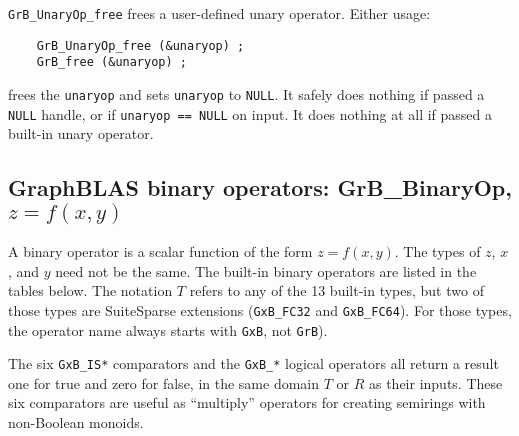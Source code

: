 \documentclass[12pt]{article}
\begin{document}
\verb'GrB_UnaryOp_free' frees a user-defined unary operator.
Either usage:

    {\small
    \begin{verbatim}
    GrB_UnaryOp_free (&unaryop) ;
    GrB_free (&unaryop) ; \end{verbatim}}

\noindent
frees the \verb'unaryop' and sets \verb'unaryop' to \verb'NULL'.
It safely does nothing if passed a \verb'NULL'
handle, or if \verb'unaryop == NULL' on input.
It does nothing at all if passed a built-in unary operator.

\newpage
\subsection{GraphBLAS binary operators: {\sf GrB\_BinaryOp}, $z=f(x,y)$} %
\label{binaryop}

A binary operator is a scalar function of the form $z=f(x,y)$.  The types of
$z$, $x$, and $y$ need not be the same.  The built-in binary operators are
listed in the tables below.  The notation $T$ refers to any of the 13
built-in types, but two of those types are SuiteSparse extensions
(\verb'GxB_FC32' and \verb'GxB_FC64').  For those types, the operator name
always starts with \verb'GxB', not \verb'GrB').

The six \verb'GxB_IS*' comparators and the \verb'GxB_*' logical
operators all return a result one for true and zero for false, in the same
domain $T$ or $R$ as their inputs.  These six comparators are useful
as ``multiply'' operators for creating semirings with non-Boolean monoids.
\end{document}

